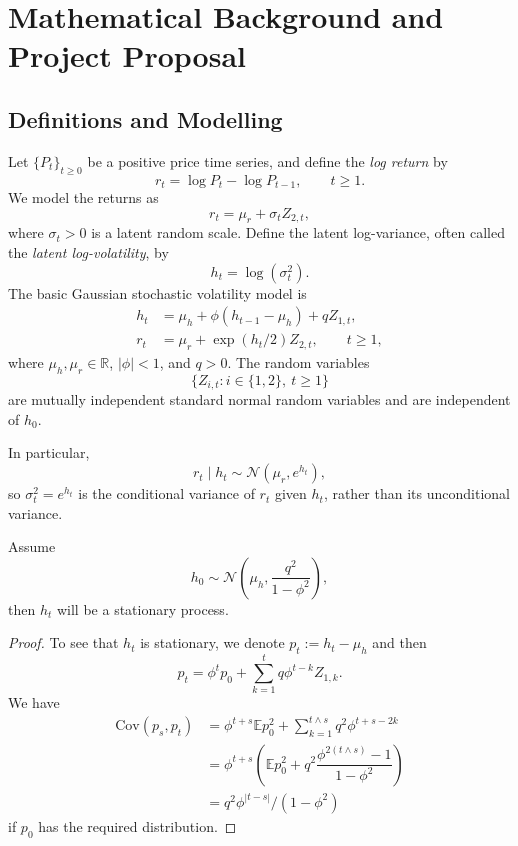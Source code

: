 \section{Mathematical Background and Project Proposal}

\subsection{Definitions and Modelling}

\begin{definition}
    \label{def: sv-model}
Let $\{P_t\}_{t\geq 0}$ be a positive price time series, and define
the \emph{log return} by
\[
r_t=\log P_t-\log P_{t-1}, \qquad t\geq 1.
\]
We model the returns as
\[
r_t=\mu_r+\sigma_t Z_{2,t},
\]
where $\sigma_t>0$ is a latent random scale. Define the latent
log-variance, often called the \emph{latent log-volatility}, by
\[
h_t=\log(\sigma_t^2).
\]
The basic Gaussian stochastic volatility model is
\[
\begin{aligned}
h_t
&=\mu_h+\phi(h_{t-1}-\mu_h)+qZ_{1,t},\\
r_t
&=\mu_r+\exp(h_t/2)Z_{2,t},
\qquad t\geq 1,
\end{aligned}
\]
where $\mu_h,\mu_r\in\mathbb R$, $|\phi|<1$, and $q>0$.
The random variables
\[
\{Z_{i,t}:i\in\{1,2\},\ t\geq 1\}
\]
are mutually independent standard normal random variables and
are independent of $h_0$.\par
In particular,
\[
r_t\mid h_t
\sim\mathcal N(\mu_r,e^{h_t}),
\]
so $\sigma_t^2=e^{h_t}$ is the conditional variance of $r_t$
given $h_t$, rather than its unconditional variance.
\end{definition}
\vspace{1em}
\begin{proposition}
    Assume
\[
h_0\sim
\mathcal N\left(\mu_h,\frac{q^2}{1-\phi^2}\right),
\]
then $h_t$ will be a stationary process.
\end{proposition}
\begin{proof}
    To see that $h_t$ is stationary, we denote
    \(
    p_t := h_t - \mu_h
    \)
    and then
    \[
    p_t = \phi^tp_0 +\sum\limits_{k=1}^t q\phi^{t-k}Z_{1,k}.
    \]
    We have
    \[
    \begin{aligned}
    \text{Cov}(p_s,p_t) &= \phi^{t+s}\mathbb Ep_0^2 + \sum\limits_{k=1}^{t\wedge s} q^2\phi^{t+s-2k} \\
    &= \phi^{t+s}\left(\mathbb Ep_0^2 +q^2\dfrac{\phi^{2(t\wedge s)}-1}{1-\phi^2}\right) \\
    &=q^2\phi^{|t-s|}/(1-\phi^2)
    \end{aligned}
    \]
    if $p_0$ has the required distribution.
\end{proof}


